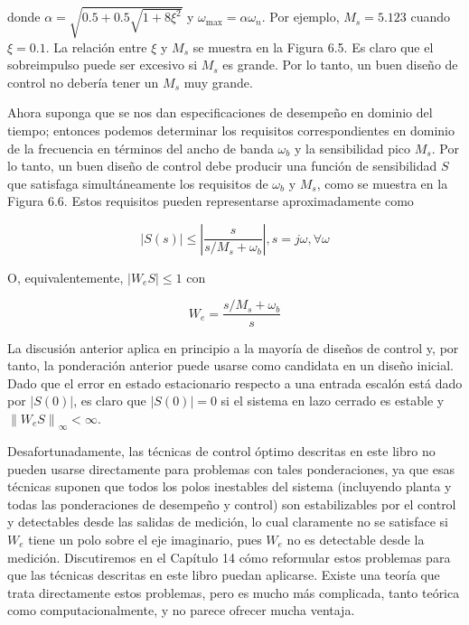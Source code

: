 donde $\alpha=\sqrt{0.5+0.5 \sqrt{1+8 \xi^{2}}}$ y $\omega_{\max }=\alpha \omega_{n}$. Por ejemplo, $M_{s}=5.123$ cuando $\xi=0.1$. La relación entre $\xi$ y $M_{s}$ se muestra en la Figura 6.5. Es claro que el sobreimpulso puede ser excesivo si $M_{s}$ es grande. Por lo tanto, un buen diseño de control no debería tener un $M_{s}$ muy grande.

Ahora suponga que se nos dan especificaciones de desempeño en dominio del tiempo; entonces podemos determinar los requisitos correspondientes en dominio de la frecuencia en términos del ancho de banda $\omega_{b}$ y la sensibilidad pico $M_{s}$. Por lo tanto, un buen diseño de control debe producir una función de sensibilidad $S$ que satisfaga simultáneamente los requisitos de $\omega_{b}$ y $M_{s}$, como se muestra en la Figura 6.6. Estos requisitos pueden representarse aproximadamente como

$$
|S(s)| \leq\left|\frac{s}{s / M_{s}+\omega_{b}}\right|, s=j \omega, \forall \omega
$$



O, equivalentemente, $\left|W_{e} S\right| \leq 1$ con


\begin{equation*}
W_{e}=\frac{s / M_{s}+\omega_{b}}{s} \tag{6.5}
\end{equation*}


La discusión anterior aplica en principio a la mayoría de diseños de control y, por tanto, la ponderación anterior puede usarse como candidata en un diseño inicial. Dado que el error en estado estacionario respecto a una entrada escalón está dado por $|S(0)|$, es claro que $|S(0)|=0$ si el sistema en lazo cerrado es estable y $\left\|W_{e} S\right\|_{\infty}<\infty$.

Desafortunadamente, las técnicas de control óptimo descritas en este libro no pueden usarse directamente para problemas con tales ponderaciones, ya que esas técnicas suponen que todos los polos inestables del sistema (incluyendo planta y todas las ponderaciones de desempeño y control) son estabilizables por el control y detectables desde las salidas de medición, lo cual claramente no se satisface si $W_{e}$ tiene un polo sobre el eje imaginario, pues $W_{e}$ no es detectable desde la medición. Discutiremos en el Capítulo 14 cómo reformular estos problemas para que las técnicas descritas en este libro puedan aplicarse. Existe una teoría que trata directamente estos problemas, pero es mucho más complicada, tanto teórica como computacionalmente, y no parece ofrecer mucha ventaja.


